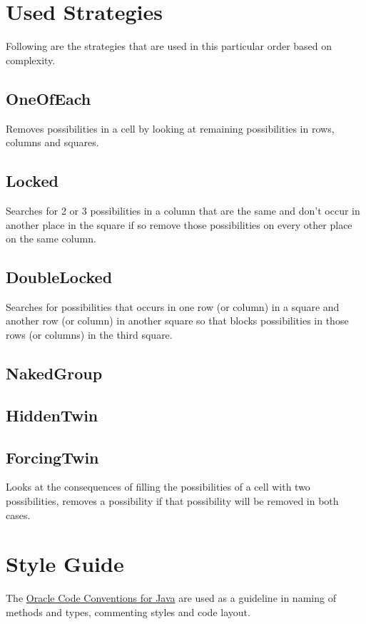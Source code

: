\documentclass[11pt, a4paper, fleqn]{article}
\begin{document}
\section{Used Strategies}
Following are the strategies that are used in this particular order based on complexity.
\subsection{OneOfEach}
Removes possibilities in a cell by looking at remaining possibilities in 
rows, columns and squares.
\subsection{Locked}
Searches for 2 or 3 possibilities in a column that are the same and don't 
occur in another place in the square if so remove those possibilities on 
every other place on the same column.
\subsection{DoubleLocked}
Searches for possibilities that occurs in one row (or column) in a square
and another row (or column) in another square so that blocks possibilities
in those rows (or columns) in the third square.
\subsection{NakedGroup}
\subsection{HiddenTwin}
\subsection{ForcingTwin}
Looks at the consequences of filling the possibilities of a cell with two
possibilities, removes a possibility if that possibility will be removed in
both cases.

\section{Style Guide}
The \href{http://www.oracle.com/technetwork/java/javase/documentation/codeconvtoc-136057.html}{Oracle Code Conventions for Java}
are used as a guideline in naming of methods and types, commenting styles and code layout.
\end{document}
